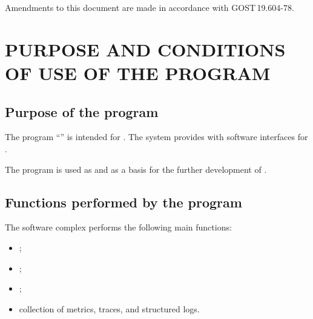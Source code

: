 \documentclass[12pt,a4paper]{extarticle}
\begin{document}
Amendments to this document are made in accordance with GOST\,19.604-78\cite{gost19604}.

\clearpage

\hypersetup{linkcolor=black}
\tableofcontents
\hypersetup{linkcolor=blue}
\thispagestyle{fancy}
\clearpage

\section{PURPOSE AND CONDITIONS OF USE OF THE PROGRAM}

\subsection{Purpose of the program}

\begin{hseExample}
The program \enquote{\projectname} is intended for . The system provides  with software interfaces for .

The program is used as  and as a basis for the further development of .
\end{hseExample}

\subsection{Functions performed by the program}

\begin{hseExample}
The software complex performs the following main functions:

\begin{itemize}[leftmargin=1.25cm]
    \item {};
    \item {};
    \item {};
    \item collection of metrics, traces, and structured logs.
\end{itemize}
\end{hseExample}
\end{document}

